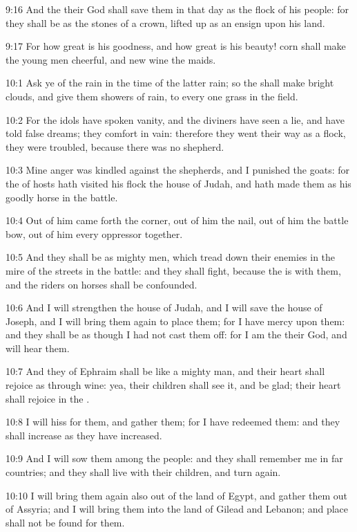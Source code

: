 9:16 And the \LORD their God shall save them in that day as the flock of his people: for they shall be as the stones of a crown, lifted up as an ensign upon his land.

9:17 For how great is his goodness, and how great is his beauty! corn shall make the young men cheerful, and new wine the maids.

10:1 Ask ye of the \LORD rain in the time of the latter rain; so the \LORD shall make bright clouds, and give them showers of rain, to every one grass in the field.

10:2 For the idols have spoken vanity, and the diviners have seen a lie, and have told false dreams; they comfort in vain: therefore they went their way as a flock, they were troubled, because there was no shepherd.

10:3 Mine anger was kindled against the shepherds, and I punished the goats: for the \LORD of hosts hath visited his flock the house of Judah, and hath made them as his goodly horse in the battle.

10:4 Out of him came forth the corner, out of him the nail, out of him the battle bow, out of him every oppressor together.

10:5 And they shall be as mighty men, which tread down their enemies in the mire of the streets in the battle: and they shall fight, because the \LORD is with them, and the riders on horses shall be confounded.

10:6 And I will strengthen the house of Judah, and I will save the house of Joseph, and I will bring them again to place them; for I have mercy upon them: and they shall be as though I had not cast them off: for I am the \LORD their God, and will hear them.

10:7 And they of Ephraim shall be like a mighty man, and their heart shall rejoice as through wine: yea, their children shall see it, and be glad; their heart shall rejoice in the \LORD.

10:8 I will hiss for them, and gather them; for I have redeemed them: and they shall increase as they have increased.

10:9 And I will sow them among the people: and they shall remember me in far countries; and they shall live with their children, and turn again.

10:10 I will bring them again also out of the land of Egypt, and gather them out of Assyria; and I will bring them into the land of Gilead and Lebanon; and place shall not be found for them.

